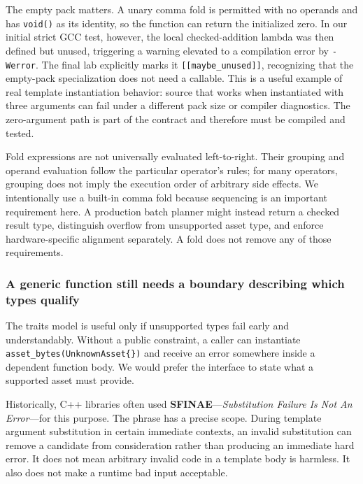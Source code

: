 The empty pack matters. A unary comma fold is permitted with no operands and has \texttt{void()} as its identity, so the function can return the initialized zero. In our initial strict GCC test, however, the local checked-addition lambda was then defined but unused, triggering a warning elevated to a compilation error by \texttt{-Werror}. The final lab explicitly marks it \texttt{{[}{[}maybe\_unused{]}{]}}, recognizing that the empty-pack specialization does not need a callable. This is a useful example of real template instantiation behavior: source that works when instantiated with three arguments can fail under a different pack size or compiler diagnostics. The zero-argument path is part of the contract and therefore must be compiled and tested.

Fold expressions are not universally evaluated left-to-right. Their grouping and operand evaluation follow the particular operator's rules; for many operators, grouping does not imply the execution order of arbitrary side effects. We intentionally use a built-in comma fold because sequencing is an important requirement here. A production batch planner might instead return a checked result type, distinguish overflow from unsupported asset type, and enforce hardware-specific alignment separately. A fold does not remove any of those requirements.

\subsubsection{A generic function still needs a boundary describing which types qualify}\label{a-generic-function-still-needs-a-boundary-describing-which-types-qualify}

The traits model is useful only if unsupported types fail early and understandably. Without a public constraint, a caller can instantiate \texttt{asset\_bytes(UnknownAsset\{\})} and receive an error somewhere inside a dependent function body. We would prefer the interface to state what a supported asset must provide.

Historically, C++ libraries often used \textbf{SFINAE}---\emph{Substitution Failure Is Not An Error}---for this purpose. The phrase has a precise scope. During template argument substitution in certain immediate contexts, an invalid substitution can remove a candidate from consideration rather than producing an immediate hard error. It does not mean arbitrary invalid code in a template body is harmless. It also does not make a runtime bad input acceptable.

